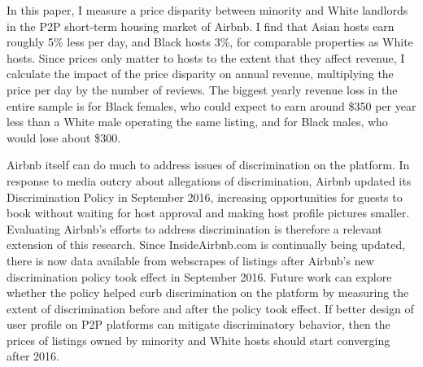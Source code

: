 

In this paper, I measure a price disparity between minority and White landlords in the P2P short-term housing market of Airbnb. I find that Asian hosts earn roughly 5\% less per day, and Black hosts 3\%, for comparable properties as White hosts. Since prices only matter to hosts to the extent that they affect revenue, I calculate the impact of the price disparity on annual revenue, multiplying the price per day by the number of reviews. The biggest yearly revenue loss in the entire sample is for Black females, who could expect to earn around \$350 per year less than a White male operating the same listing, and for Black males, who would lose about \$300. 

Airbnb itself can do much to address issues of discrimination on the platform. In response to media outcry about allegations of discrimination, Airbnb updated its Discrimination Policy in September 2016, increasing opportunities for guests to book without waiting for host approval and making host profile pictures smaller. Evaluating Airbnb's efforts to address discrimination is therefore a relevant extension of this research. Since InsideAirbnb.com is continually being updated, there is now data available from webscrapes of listings after Airbnb's new discrimination policy took effect in September 2016. Future work can explore whether the policy helped curb discrimination on the platform by measuring the extent of discrimination before and after the policy took effect. If better design of user profile on P2P platforms can mitigate discriminatory behavior, then the prices of listings owned by minority and White hosts should start converging after 2016. 


